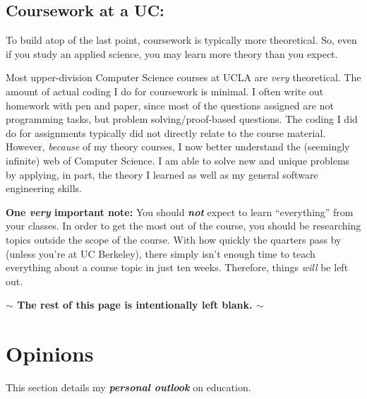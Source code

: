 \documentclass[12pt]{article}
\newenvironment{example}{
\begin{tcolorbox}[title=Example, colback=blue!5!white, colframe=black!75!blue]
}{ \end{tcolorbox} }
\renewcommand{\it}[1]{\textit{{#1}}}
\renewcommand{\bf}[1]{\textbf{{#1}}}
\newcommand{\ib}[1]{\textit{\textbf{{#1}}}}
\begin{document}
\subsection{Coursework at a UC:}
To build atop of the last point, coursework is typically more theoretical. So,
even if you study an applied science, you may learn more theory than you expect.
\begin{example}
  Most upper-division Computer Science courses at UCLA are \it{very} theoretical.
  The amount of actual coding I do for coursework is minimal. I often write out
  homework with pen and paper, since most of the questions assigned are not
  programming tasks, but problem solving/proof-based questions. The
  coding I did do for assignments typically did not directly relate to the
  course material. However, \it{because} of my theory courses, I now better
  understand the (seemingly infinite) web of Computer Science. I am
  able to solve new and unique problems by applying, in part, the theory I
  learned as well as my general software engineering skills.
\end{example}

\bf{One \ib{very} important note:} You should \ib{not} expect to learn ``everything''
from your classes. In order to get the most out of the course, you should be
researching topics outside the scope of the course. With how quickly the
quarters pass by (unless you're at UC Berkeley), there simply isn't enough time
to teach everything about a course topic in just ten weeks. Therefore, things
\it{will} be left out.
\begin{center}
  \vspace{5em}
  \bf{$\bm{\sim}$ The rest of this page is intentionally left blank. $\bm{\sim}$}
\end{center}

\newpage
\section{Opinions}
This section details my \ib{personal outlook} on education.
\end{document}
